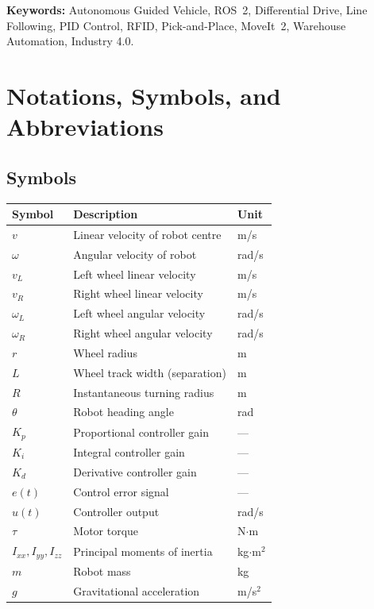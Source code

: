 \documentclass[12pt,a4paper,oneside]{report}
\begin{document}
\textbf{Keywords:} Autonomous Guided Vehicle, ROS~2, Differential Drive, Line Following, PID Control, RFID, Pick-and-Place, MoveIt~2, Warehouse Automation, Industry 4.0.

\newpage

\chapter*{Notations, Symbols, and Abbreviations}

\section*{Symbols}

\begin{longtable}{p{2.5cm} p{8cm} p{3cm}}
\toprule
\textbf{Symbol} & \textbf{Description} & \textbf{Unit} \\
\midrule
$v$ & Linear velocity of robot centre & m/s \\
$\omega$ & Angular velocity of robot & rad/s \\
$v_L$ & Left wheel linear velocity & m/s \\
$v_R$ & Right wheel linear velocity & m/s \\
$\omega_L$ & Left wheel angular velocity & rad/s \\
$\omega_R$ & Right wheel angular velocity & rad/s \\
$r$ & Wheel radius & m \\
$L$ & Wheel track width (separation) & m \\
$R$ & Instantaneous turning radius & m \\
$\theta$ & Robot heading angle & rad \\
$K_p$ & Proportional controller gain & --- \\
$K_i$ & Integral controller gain & --- \\
$K_d$ & Derivative controller gain & --- \\
$e(t)$ & Control error signal & --- \\
$u(t)$ & Controller output & rad/s \\
$\tau$ & Motor torque & N$\cdot$m \\
$I_{xx}, I_{yy}, I_{zz}$ & Principal moments of inertia & kg$\cdot$m$^2$ \\
$m$ & Robot mass & kg \\
$g$ & Gravitational acceleration & m/s$^2$ \\

\end{longtable}
\end{document}
